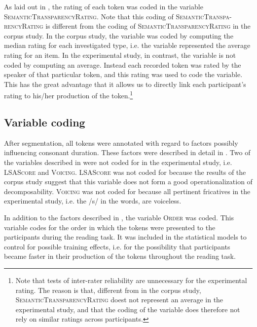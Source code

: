  As laid out in , the rating of each token was coded in the variable  \textsc{SemanticTransparencyRating}. Note that this coding of \textsc{SemanticTranspa-rencyRating} is different from the coding of \textsc{SemanticTransparencyRating} in the corpus study. In the corpus study, the variable was coded by computing the median rating for each investigated type, i.e. the variable represented the average rating for an item. 
 In the experimental study, in contrast, the variable is not coded by computing an average. Instead each recorded token 
 was rated by the speaker of that particular token, and this rating was used to code the variable.
 This has the great advantage that it allows us to directly link each participant's rating to his/her production of the token.\footnote{Note that tests of inter-rater reliability are unnecessary for the experimental rating. The reason is that, different from in the corpus study, \textsc{SemanticTransparencyRating} doest not represent an average in the experimental study, and that the coding of the variable does therefore not rely on similar ratings across participants.} 
 \vspace{-0.3cm}



\subsection{Variable coding} \label{variable coding experiment}
 


After segmentation, all tokens were annotated with regard to factors possibly influencing consonant duration. These factors were described in detail in . 
Two of the variables described in  were not coded for in the experimental study, i.e. \textsc{LSAScore} and \textsc{Voicing}. 
\textsc{LSAScore} was not coded for because the results of the corpus study suggest that this variable does not form a good operationalization of decomposability. 
\textsc{Voicing} was not coded for because all pertinent fricatives in the experimental study, i.e. the /s/ in the words, are voiceless.

In addition to the factors described in , the variable \textsc{Order} was coded. This variable codes for the order in which the tokens were presented to the participants during the reading task. It was included in the statistical models to control for possible training effects, i.e. for the possibility that participants became faster in their production of the tokens throughout the reading task.

